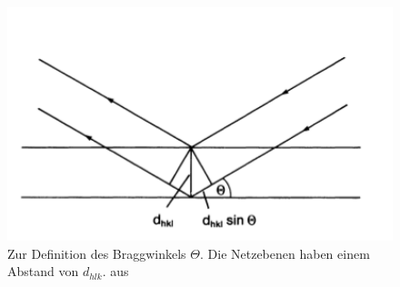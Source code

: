 \begin{figure}
    \includegraphics[width=1.0\textwidth]{pics/Bragg_Winkel}
    \caption{Zur Definition des Braggwinkels $\Theta$. Die Netzebenen haben einem Abstand 
von $d_{hlk}$.  
aus \cite{ibach2009festkorperphysik} }
    \label{fig:Bragg_Winkel}
\end{figure}


